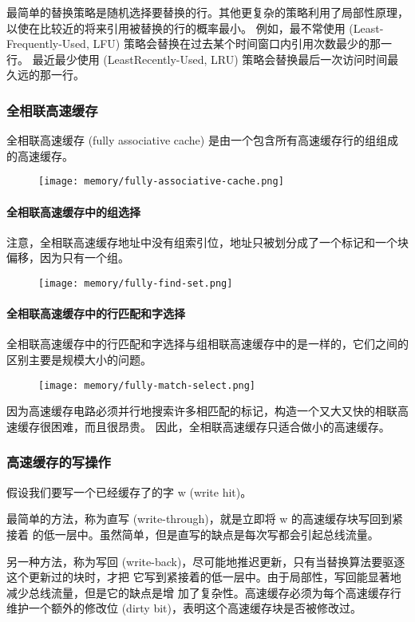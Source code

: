 最简单的替换策略是随机选择要替换的行。其他更复杂的策略利用了局部性原理，以使在比较近的将来引用被替换的行的概率最小。
例如，最不常使用 (Least-Frequently-Used, LFU) 策略会替换在过去某个时间窗口内引用次数最少的那一行。
最近最少使用 (LeastRecently-Used, LRU) 策略会替换最后一次访问时间最久远的那一行。

\subsubsection{全相联高速缓存}
全相联高速缓存 (fully associative cache) 是由一个包含所有高速缓存行的组组成的高速缓存。
\begin{figure}[H]
    \centering
    \texttt{[image: memory/fully-associative-cache.png]}
\end{figure}

\paragraph{全相联高速缓存中的组选择}
注意，全相联高速缓存地址中没有组索引位，地址只被划分成了一个标记和一个块偏移，因为只有一个组。
\begin{figure}[H]
    \centering
    \texttt{[image: memory/fully-find-set.png]}
\end{figure}

\paragraph{全相联高速缓存中的行匹配和字选择}
全相联高速缓存中的行匹配和字选择与组相联高速缓存中的是一样的，它们之间的区别主要是规模大小的问题。
\begin{figure}[H]
    \centering
    \texttt{[image: memory/fully-match-select.png]}
\end{figure}

因为高速缓存电路必须并行地搜索许多相匹配的标记，构造一个又大又快的相联高速缓存很困难，而且很昂贵。
因此，全相联高速缓存只适合做小的高速缓存。

\subsubsection{高速缓存的写操作}
假设我们要写一个已经缓存了的字 w (write hit)。

最简单的方法，称为直写 (write-through)，就是立即将 w 的高速缓存块写回到紧接着
的低一层中。虽然简单，但是直写的缺点是每次写都会引起总线流量。

另一种方法，称为写回 (write-back)，尽可能地推迟更新，只有当替换算法要驱逐这个更新过的块时，才把
它写到紧接着的低一层中。由于局部性，写回能显著地减少总线流量，但是它的缺点是增
加了复杂性。高速缓存必须为每个高速缓存行维护一个额外的修改位 (dirty bit)，表明这个高速缓存块是否被修改过。

